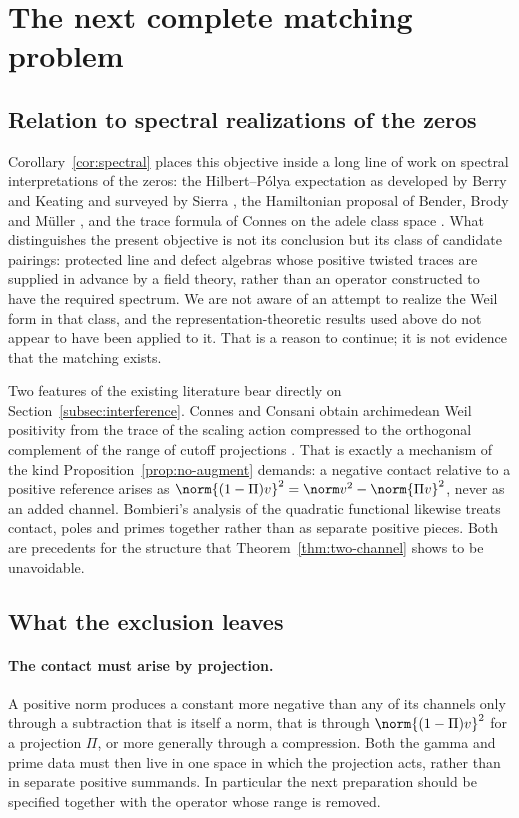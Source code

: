 \section{The next complete matching problem}\label{sec:outlook}
\subsection{Relation to spectral realizations of the zeros}
Corollary~\ref{cor:spectral} places this objective inside a long line of work
on spectral interpretations of the zeros: the Hilbert--P\'olya expectation as
developed by Berry and Keating \cite{BerryKeating} and surveyed by Sierra
\cite{Sierra}, the Hamiltonian proposal of Bender, Brody and M\"uller
\cite{BBM}, and the trace formula of Connes on the adele class space
\cite{ConnesTrace,CCM}. What distinguishes the present objective is not its
conclusion but its class of candidate pairings: protected line and defect
algebras whose positive twisted traces are supplied in advance by a field
theory, rather than an operator constructed to have the required spectrum.
We are not aware of an attempt to realize the Weil form in that class, and
the representation-theoretic results used above
\cite{Sphere,Schur,RG,EKRS,Klyuev} do not appear to have been applied to it.
That is a reason to continue; it is not evidence that the matching exists.

Two features of the existing literature bear directly on
Section~\ref{subsec:interference}. Connes and Consani obtain archimedean Weil
positivity from the trace of the scaling action compressed to the orthogonal
complement of the range of cutoff projections \cite{CCWeil}. That is exactly
a mechanism of the kind Proposition~\ref{prop:no-augment} demands: a negative
contact relative to a positive reference arises as
$\norm{(1-\Pi)v}^2=\norm v^2-\norm{\Pi v}^2$, never as an added channel.
Bombieri's analysis of the quadratic functional \cite{Bombieri} likewise
treats contact, poles and primes together rather than as separate positive
pieces. Both are precedents for the structure that
Theorem~\ref{thm:two-channel} shows to be unavoidable.

\subsection{What the exclusion leaves}\label{subsec:leaves}
\paragraph{The contact must arise by projection.}
A positive norm produces a constant more negative than any of its channels
only through a subtraction that is itself a norm, that is through
$\norm{(1-\Pi)v}^2$ for a projection $\Pi$, or more generally through a
compression. Both the gamma and prime data must then live in one space in
which the projection acts, rather than in separate positive summands. In
particular the next preparation should be specified together with the
operator whose range is removed.

